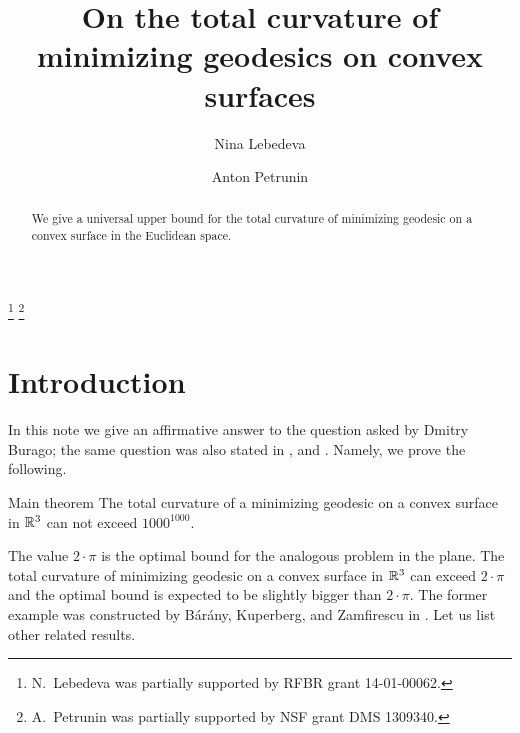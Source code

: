\documentclass[a4paper,10pt]{amsart}
\begin{document}
\title{On the total curvature of \\
minimizing geodesics on convex surfaces}
\author{Nina Lebedeva}
\address{N. Lebedeva\newline\vskip-4mm
Math. Dept.
St. Petersburg State University,
Universitetsky pr., 28, 
Stary Peterhof, 
198504, Russia.
\newline\vskip-4mm
Steklov Institute,
27 Fontanka, St. Petersburg, 
191023, Russia.}
\author{Anton Petrunin}
\address{A. Petrunin\newline\vskip-4mm
Math. Dept. PSU,
University Park, PA 16802,
USA}
\thanks{N.~Lebedeva was partially supported by RFBR grant 
14-01-00062.}
\thanks{A.~Petrunin was partially supported by NSF grant DMS 1309340.}


\date{}

\begin{abstract}
We give a universal upper bound 
for the total curvature 
of minimizing geodesic 
on a convex surface 
in the Euclidean space.
\end{abstract}
\maketitle

\section{Introduction}

In this note we give an affirmative answer to the question asked by Dmitry Burago; 
the same question was also stated in \cite{AH-PSV}, \cite{pach} and \cite{BKZ}.
Namely, we prove the following.

\begin{thm}{Main theorem}\label{thm:main}
The total curvature of a minimizing geodesic
on a convex surface in $\mathbb{R}^3$ can not exceed $1000^{1000}$.
\end{thm}

The value $2\cdot\pi$ is the optimal bound for the analogous problem in the plane.
The total curvature
of minimizing geodesic on a convex surface in $\mathbb{R}^3$
can exceed $2\cdot\pi$
and the optimal bound 
is expected to be slightly bigger than $2\cdot\pi$.
The former example was constructed by B{\'a}r{\'a}ny,
Kuperberg, 
and Zamfirescu in \cite{BKZ}.
Let us list other related results.
\end{document}
